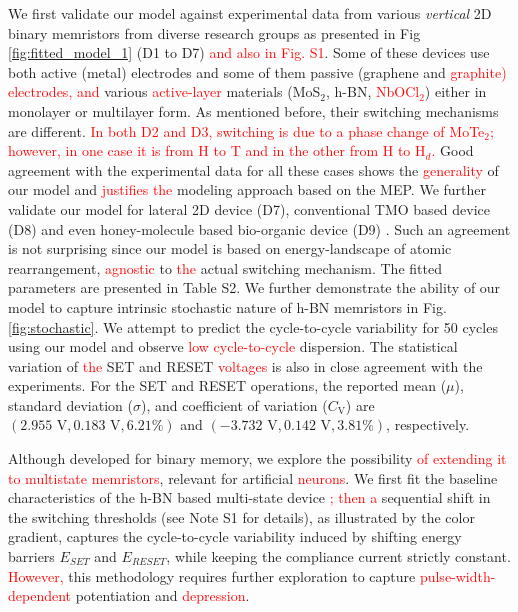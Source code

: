\documentclass[aip,apl,reprint,floatfix]{revtex4-2}
\newcommand{\changed}[1]{\textcolor{red}{#1}}
\begin{document}
We first validate our model against experimental data from various \textit{vertical} 2D binary memristors from diverse research groups \cite{hou2024strain,atomrister,zhang2019electric,Sanchali,deng2022,jnohBN} as presented in Fig \ref{fig:fitted_model_1} (D1 to D7) \textcolor{red}{and also in Fig. S1}. Some of these devices use both active (metal) electrodes and some of them passive (graphene and \changed{graphite) electrodes, and} various \changed{active-layer} materials (MoS$_{2}$, h-BN, \changed{NbOCl$_{2}$}) either in monolayer or multilayer form.  As mentioned before, their switching mechanisms are different.  \changed{In both D2 and D3, switching is due to a phase change of MoTe$_{2}$; however, in one case it is from H to T and in the other from H to H$_{d}$.} Good agreement with the experimental data for all these cases shows the \changed{generality} of our model and \changed{justifies the} modeling approach based on the MEP. We further validate our model for lateral 2D device (D7), conventional TMO based device (D8) and even honey-molecule based bio-organic device (D9)  \cite{WSe2,Jiang2016,SUEOKA2022106622}. Such an agreement is not surprising since our model is based on energy-landscape of atomic rearrangement, \changed{agnostic} to \changed{the} actual switching mechanism. The fitted parameters are presented in Table S2. We further demonstrate the ability of our model to capture intrinsic stochastic nature of h-BN memristors \cite{Lee} in Fig.\ref{fig:stochastic}. We attempt to predict the cycle-to-cycle variability \cite{deng2022} for 50 cycles using our model and observe \changed{low cycle-to-cycle} dispersion. The statistical variation of \changed{the} SET and RESET \changed{voltages} is also in close agreement with the experiments. For the SET and RESET operations, the reported mean ($\mu$), standard deviation ($\sigma$), and coefficient of variation ($C_{\text{V}}$) are $(2.955\text{ V}, 0.183\text{ V}, 6.21\%)$ and $(-3.732\text{ V}, 0.142\text{ V}, 3.81\%)$, respectively. 

Although developed for binary memory, we explore the possibility \changed{of extending it to multistate memristors}, relevant for artificial \changed{neurons}. We first fit the baseline characteristics of the h-BN based multi-state device \cite{Shi2018Electronic}\changed{; then a} sequential shift in the switching thresholds (see Note S1 for details), as illustrated by the color gradient, captures the cycle-to-cycle variability induced by shifting energy barriers $E_{SET}$ and $E_{RESET}$, while keeping the compliance current strictly constant. \changed{However,} this methodology requires further exploration to capture \changed{pulse-width-dependent} potentiation and \changed{depression}.
\end{document}
